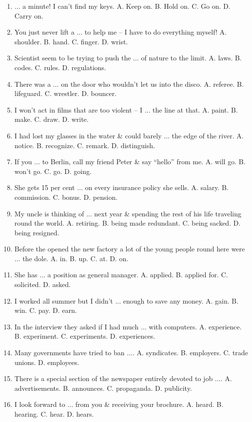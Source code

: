 \documentclass{article}
\numberwithin{equation}{section}
\begin{document}
\begin{enumerate}[leftmargin=2mm]
	\item $\ldots$ a minute! I can't find my keys. A. Keep on. B. Hold on. C. Go on. D. Carry on.
	\item You just never lift a $\ldots$ to help me -- I have to do everything myself! A. shoulder. B. hand. C. finger. D. wrist.
	\item Scientist seem to be trying to push the $\ldots$ of nature to the limit. A. laws. B. codes. C. rules. D. regulations.
	\item There was a $\ldots$ on the door who wouldn't let us into the disco. A. referee. B. lifeguard. C. wrestler. D. bouncer.
	\item I won't act in films that are too violent -- I $\ldots$ the line at that. A. paint. B. make. C. draw. D. write.
	\item I had lost my glasses in the water \& could barely $\ldots$ the edge of the river. A. notice. B. recognize. C. remark. D. distinguish.
	\item If you $\ldots$ to Berlin, call my friend Peter \& say ``hello'' from me. A. will go. B. won't go. C. go. D. going.
	\item She gets 15 per cent $\ldots$ on every insurance policy she sells. A. salary. B. commission. C. bonus. D. pension.
	\item My uncle is thinking of $\ldots$ next year \& spending the rest of his life traveling round the world. A. retiring. B. being made redundant. C. being sacked. D. being resigned.
	\item Before the opened the new factory a lot of the young people round here were $\ldots$ the dole. A. in. B. up. C. at. D. on.
	\item She has $\ldots$ a position as general manager. A. applied. B. applied for. C. solicited. D. asked.
	\item I worked all summer but I didn't $\ldots$ enough to save any money. A. gain. B. win. C. pay. D. earn.
	\item In the interview they asked if I had much $\ldots$ with computers. A. experience. B. experiment. C. experiments. D. experiences.
	\item Many governments have tried to ban $\ldots$. A. syndicates. B. employers. C. trade unions. D. employees.
	\item There is a special section of the newspaper entirely devoted to job $\ldots$. A. advertisements. B. announces. C. propaganda. D. publicity.
	\item I look forward to $\ldots$ from you \& receiving your brochure. A. heard. B. hearing. C. hear. D. hears.

\end{enumerate}
\end{document}
